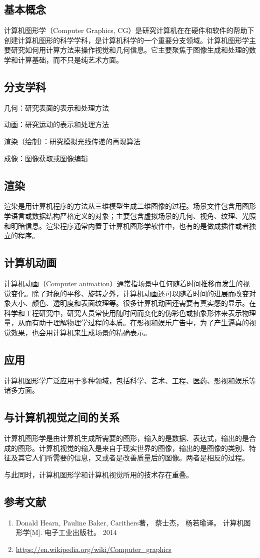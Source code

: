 
\subsection{基本概念}
计算机图形学（Computer Graphics, CG）是研究计算机在在硬件和软件的帮助下创建计算机图形的科学学科，是计算机科学的一个重要分支领域。计算机图形学主要研究如何用计算方法来操作视觉和几何信息。它主要聚焦于图像生成和处理的数学和计算基础，而不只是纯艺术方面。

\subsection{分支学科}
几何：研究表面的表示和处理方法

动画：研究运动的表示和处理方法

渲染（绘制）：研究模拟光线传递的再现算法

成像：图像获取或图像编辑


\subsection{渲染}
渲染是用计算机程序的方法从三维模型生成二维图像的过程。场景文件包含用图形学语言或数据结构严格定义的对象；主要包含虚拟场景的几何、视角、纹理、光照和明暗信息。渲染程序通常内置于计算机图形学软件中，也有的是做成插件或者独立的程序。



\subsection{计算机动画}
计算机动画（Computer animation）通常指场景中任何随着时间推移而发生的视觉变化。除了对象的平移、旋转之外，计算机动画还可以随着时间的进展而改变对象大小、颜色、透明度和表面纹理等。很多计算机动画还需要有真实感的显示。在科学和工程研究中，研究人员常使用随时间而变化的伪彩色或抽象形体来表示物理量，从而有助于理解物理学过程的本质。在影视和娱乐广告中，为了产生逼真的视觉效果，也会用计算机来生成场景的精确表示。


\subsection{应用}
计算机图形学广泛应用于多种领域，包括科学、艺术、工程、医药、影视和娱乐等诸多方面。

\subsection{与计算机视觉之间的关系}
计算机图形学是由计算机生成所需要的图形，输入的是数据、表达式，输出的是合成的图形。计算机视觉的输入是来自于现实世界的图像，输出的是图像的类别、特征及其它人们所需要的信息，又或者是改善质量后的图像。两者是相反的过程。

与此同时，计算机图形学和计算机视觉所用的技术存在重叠。


\subsection{参考文献}
\begin{enumerate}
\item Donald Hearn, Pauline Baker, Carithers著， 蔡士杰， 杨若瑜译。 计算机图形学[M]. 电子工业出版社。 2014
\item \href{https://en.wikipedia.org/wiki/Computer\_graphics}{https://en.wikipedia.org/wiki/Computer\_graphics}
\end{enumerate}